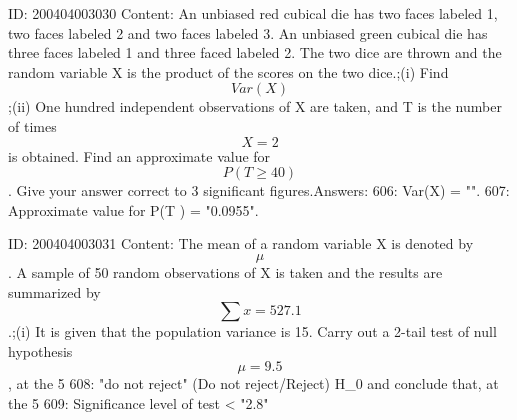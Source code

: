 \documentclass{article}
\begin{document}
ID: 200404003030
Content:
An unbiased red cubical die has two faces labeled 1, two faces labeled 2 and two faces labeled 3. An unbiased green cubical die has three faces labeled 1 and three faced labeled 2. The two dice are thrown and the random variable X is the product of the scores on the two dice.;(i) Find $$Var(X)$$;(ii) One hundred independent observations of X are taken, and T is the number of times $$X = 2$$ is obtained. Find an approximate value for $$P\left(T \geq 40\right)$$. Give your answer correct to 3 significant figures.Answers:
606: Var(X) = "".
607: Approximate value for P\left(T \right) = "0.0955".

ID: 200404003031
Content:
The mean of a random variable X is denoted by $$\mu$$. A sample of 50 random observations of X is taken and the results are summarized by $$\sum x = 527.1$$.;(i) It is given that the population variance is 15. Carry out a 2-tail test of null hypothesis $$\mu = 9.5$$, at the 5%
608: "do not reject" (Do not reject/Reject) H_0 and conclude that, at the 5%
609: Significance level of test < "2.8"%
\end{document}
